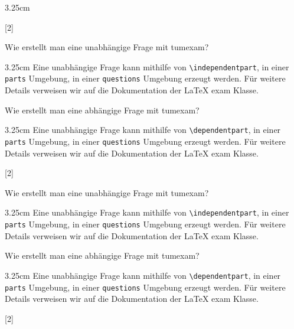 \documentclass[german, @CLASSOPTIONS@]{tumexam}
\begin{document}
\begin{questions}
\begin{parts}
\begin{solutionbox}{3.25cm}
    \end{solutionbox}
  \end{parts}
  \clearpage
  [2]
  \begin{parts}
    \independentpart
    Wie erstellt man eine unabhängige Frage mit tumexam?
    \begin{solutionbox}{3.25cm}
      Eine unabhängige Frage kann mithilfe von \texttt{\textbackslash{independentpart}}, in einer \texttt{parts} Umgebung, in einer \texttt{questions} Umgebung erzeugt werden. Für weitere Details verweisen wir auf die Dokumentation der \LaTeX{} exam Klasse.
    \end{solutionbox}
    \dependentpart
    Wie erstellt man eine abhängige Frage mit tumexam?
    \begin{solutionbox}{3.25cm}
      Eine unabhängige Frage kann mithilfe von \texttt{\textbackslash{dependentpart}}, in einer \texttt{parts} Umgebung, in einer \texttt{questions} Umgebung erzeugt werden. Für weitere Details verweisen wir auf die Dokumentation der \LaTeX{} exam Klasse.
    \end{solutionbox}
  \end{parts}
  \clearpage
  [2]
  \begin{parts}
    \independentpart
    Wie erstellt man eine unabhängige Frage mit tumexam?
    \begin{solutionbox}{3.25cm}
      Eine unabhängige Frage kann mithilfe von \texttt{\textbackslash{independentpart}}, in einer \texttt{parts} Umgebung, in einer \texttt{questions} Umgebung erzeugt werden. Für weitere Details verweisen wir auf die Dokumentation der \LaTeX{} exam Klasse.
    \end{solutionbox}
    \dependentpart
    Wie erstellt man eine abhängige Frage mit tumexam?
    \begin{solutionbox}{3.25cm}
      Eine unabhängige Frage kann mithilfe von \texttt{\textbackslash{dependentpart}}, in einer \texttt{parts} Umgebung, in einer \texttt{questions} Umgebung erzeugt werden. Für weitere Details verweisen wir auf die Dokumentation der \LaTeX{} exam Klasse.
    \end{solutionbox}
  \end{parts}
  \clearpage
  [2]
  \begin{parts}

\end{parts}
\end{questions}
\end{document}
